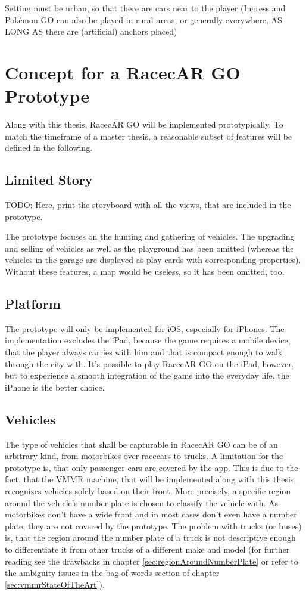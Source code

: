 Setting must be urban, so that there are cars near to the player (Ingress and Pokémon GO can also be played in rural areas, or generally everywhere, AS LONG AS there are (artificial) anchors placed)


\section{Concept for a RacecAR GO Prototype}
Along with this thesis, RacecAR GO will be implemented prototypically. To match the timeframe of a master thesis, a reasonable subset of features will be defined in the following.

\subsection{Limited Story}
TODO: Here, print the storyboard with all the views, that are included in the prototype.

The prototype focuses on the hunting and gathering of vehicles. The upgrading and selling of vehicles as well as the playground has been omitted (whereas the vehicles in the garage are displayed as play cards with corresponding properties). Without these features, a map would be useless, so it has been omitted, too.

\subsection{Platform}
The prototype will only be implemented for iOS, especially for iPhones. The implementation excludes the iPad, because the game requires a mobile device, that the player always carries with him and that is compact enough to walk through the city with. It’s possible to play RacecAR GO on the iPad, however, but to experience a smooth integration of the game into the everyday life, the iPhone is the better choice.

\subsection{Vehicles}
The type of vehicles that shall be capturable in RacecAR GO can be of an arbitrary kind, from motorbikes over racecars to trucks. A limitation for the prototype is, that only passenger cars are covered by the app. This is due to the fact, that the VMMR machine, that will be implemented along with this thesis, recognizes vehicles solely based on their front. More precisely, a specific region around the vehicle's number plate is chosen to classify the vehicle with. As motorbikes don't have a wide front and in most cases don't even have a number plate, they are not covered by the prototype. The problem with trucks (or buses) is, that the region around the number plate of a truck is not descriptive enough to differentiate it from other trucks of a different make and model (for further reading see the drawbacks in chapter \ref{sec:regionAroundNumberPlate} or refer to the ambiguity issues in the bag-of-words section of chapter \ref{sec:vmmrStateOfTheArt}).

